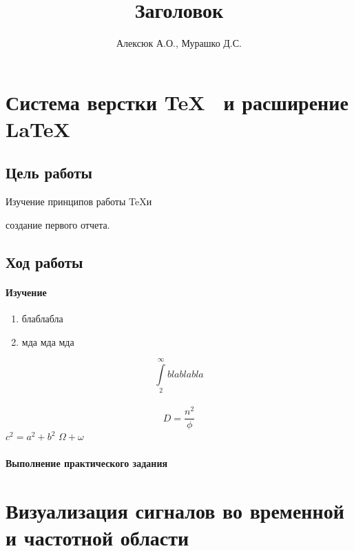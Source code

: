 \documentclass[10pt,a4paper]{article}
\author{Алексюк А.О., Мурашко Д.С.}
\title{Заголовок}
\begin{document}
\maketitle
\tableofcontents
\pagebreak
\section{Система верстки \TeX~ и расширение \LaTeX}
\subsection{Цель работы}
Изучение принципов работы \TeX и

создание первого отчета.
\subsection{Ход работы}
\paragraph{Изучение}
\begin{enumerate}
\item блаблабла
\item мда мда мда
\end{enumerate}
$$\int\limits_2^{\infty} blablabla$$
\\
$$D = \frac{n^2}{\phi}$$
\hspace{10cm} $c^2=a^2+b^2$
$\Omega + 
\omega$
\paragraph{Выполнение практического задания}
\section{Визуализация сигналов во временной и частотной области}
\end{document}
